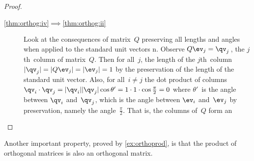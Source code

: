 \begin{proof}
\begin{description}
\item[\ref{thm:orthog:iv}$\implies$\ref{thm:orthog:ii}]
Look at the consequences of matrix~\(Q\) preserving all lengths and angles when applied to the standard unit vectors \hlist\ev n.
Observe \(Q\ev_j=\qv_j\)\,, the \(j\)th~column of matrix~\(Q\).
Then for all~\(j\), the length of the \(j\)th~column \(|\qv_j|=|Q\ev_j|=|\ev_j|=1\) by the preservation of the length of the standard unit vector.
Also, for all~\(i\neq j\) the dot product of columns \(\qv_i\cdot\qv_j=|\qv_i||\qv_j|\cos\theta'=1\cdot1\cdot\cos\frac\pi2=0\) where \(\theta'\)~is the angle between \(\qv_i\) and~\(\qv_j\), which is the angle between \(\ev_i\) and~\(\ev_j\) by preservation, namely the angle~\(\frac\pi2\).
That is, the columns of~\(Q\) form an 

\end{description}
\end{proof}


Another important property,  proved by \cref{ex:orthoprod}, is that the product of orthogonal matrices is also an orthogonal matrix.


